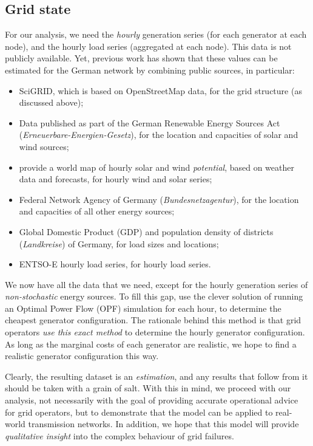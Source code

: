 \documentclass[main.tex]{subfiles}
\begin{document}
\subsection{Grid state}
For our analysis, we need the \emph{hourly} generation series (for each generator at each node), and the hourly load series (aggregated at each node). This data is not publicly available. Yet, previous work \citep{PyPSA} has shown that these values can be estimated for the German network by combining public sources, in particular:
\begin{itemize}
\item SciGRID, which is based on OpenStreetMap data, for the grid structure (as discussed above);
\item Data published as part of the German Renewable Energy Sources Act (\emph{Erneuerbare-Energien-Gesetz}), for the location and capacities of solar and wind sources;
\item \cite{Andresen2015} provide a world map of hourly solar and wind \emph{potential}, based on weather data and forecasts, for hourly wind and solar series;
\item Federal Network Agency of Germany (\emph{Bundesnetzagentur}), for the location and capacities of all other energy sources;
\item Global Domestic Product (GDP) and population density of districts (\emph{Landkreise}) of Germany, for load sizes and locations;
\item ENTSO-E hourly load series, for hourly load series.
\end{itemize}
We now have all the data that we need, except for the hourly generation series of \emph{non-stochastic} energy sources. To fill this gap, \cite{PyPSA} use the clever solution of running an Optimal Power Flow (OPF) simulation for each hour, to determine the cheapest generator configuration. The rationale behind this method is that grid operators \emph{use this exact method} to determine the hourly generator configuration. As long as the marginal costs of each generator are realistic, we hope to find a realistic generator configuration this way. 

Clearly, the resulting dataset is an \emph{estimation}, and any results that follow from it should be taken with a grain of salt. With this in mind, we proceed with our analysis, not necessarily with the goal of providing accurate operational advice for grid operators, but to demonstrate that the model can be applied to real-world transmission networks. In addition, we hope that this model will provide \emph{qualitative insight} into the complex behaviour of grid failures.
\end{document}
